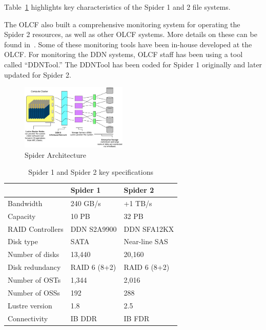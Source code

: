 Table~\ref{table:spider12} highlights key characteristics of the Spider 1 and 2 file systems.

The OLCF also built a comprehensive monitoring system for operating the Spider
2 resources, as well as other OLCF systems. More details on these can be found
in~\cite{olcf-monitoring}. Some of these monitoring tools have been in-house
developed at the OLCF. For monitoring the DDN systems, OLCF staff has been
using a tool called ``DDNTool.'' The DDNTool has been coded for Spider 1
originally and later updated for Spider 2.  


\begin{figure}[!t]
\centering
\includegraphics[width=0.45\textwidth]{./figs/spider2arch.ps}
\vspace{-0.1in}
\centering
\caption{Spider Architecture}
\label{fig:arch}
\end{figure}

\begin{table}
\begin{center}
\caption{Spider 1 and Spider 2 key specifications}
\begin{tabular}{l||l|l}
 & Spider 1 & Spider 2\\
\hline
Bandwidth & 240 GB/s & +1 TB/s \\
Capacity & 10 PB & 32 PB \\
RAID Controllers & DDN S2A9900 & DDN SFA12KX\\
Disk type & SATA & Near-line SAS\\
Number of disks & 13,440 & 20,160\\
Disk redundancy & RAID 6 (8+2) & RAID 6 (8+2)\\
Number of OSTs & 1,344 & 2,016\\
Number of OSSs & 192 & 288\\
Lustre version & 1.8 & 2.5\\
Connectivity & IB DDR & IB FDR\\ 
\end{tabular}
\end{center}
\label{table:spider12}
\end{table}


